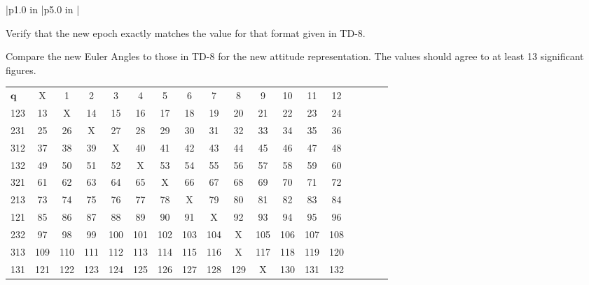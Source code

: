 \begin{table}[htbp!]
\begin{tabular}{|p{1.0 in} |p{5.0 in} |}
\begin{compactenum}
             \item Verify that the new epoch exactly matches the value for that format given in TD-8.
             \item Compare the new Euler Angles to those in TD-8 for the new attitude representation.  The values should agree to at least 13 significant figures.
          \end{compactenum}
          \vspace{.1 in}
          \begin{centering} \footnotesize
          \begin{tabular}{|l|c|c|c|c|c|c|c|c|c|c|c|c|c|c|c|c|c|}
          \hline
             & \rotatebox{90}{$\mathbf{q}$ } &
             \rotatebox{90}{ 123 } &
             \rotatebox{90}{ 231  }&
             \rotatebox{90}{ 312  } &
             \rotatebox{90}{ 132  } &
             \rotatebox{90}{ 321 } &
             \rotatebox{90}{ 213  }  &
             \rotatebox{90}{ 121 } &
             \rotatebox{90}{ 232  } &
             \rotatebox{90}{ 313  } &
             \rotatebox{90}{ 131  } &
             \rotatebox{90}{ 323  } &
             \rotatebox{90}{ 212  }  \\ \hline
             $\mathbf{q}$ & X & 1 & 2 & 3 & 4 & 5 & 6 & 7 & 8 & 9 & 10 & 11 & 12 \\ \hline
             123 & 13 & X & 14 & 15 & 16 & 17 & 18 & 19 & 20 & 21 & 22 & 23 & 24 \\ \hline
             231 & 25 & 26 & X & 27 & 28 & 29 & 30 & 31 & 32 & 33 & 34 &35 & 36 \\ \hline
             312 & 37 & 38 & 39 & X & 40 & 41 & 42 & 43 & 44 & 45 & 46 & 47 & 48 \\ \hline
             132 & 49 & 50 & 51 & 52 & X & 53 & 54 & 55 & 56 & 57 & 58 & 59 & 60 \\ \hline
             321 & 61 & 62 & 63 & 64 & 65 & X & 66 & 67 & 68 & 69 & 70 & 71 & 72 \\ \hline
             213 & 73 & 74 & 75 & 76 & 77 & 78 & X & 79 & 80 & 81 & 82 & 83 & 84  \\ \hline
             121 & 85 & 86 & 87 & 88 & 89 & 90 & 91 & X & 92 & 93 & 94 & 95 & 96  \\ \hline
             232 & 97 & 98 & 99 & 100 & 101 & 102 & 103 & 104 & X & 105 & 106 & 107 & 108  \\ \hline
             313 & 109 & 110 & 111 & 112 & 113 & 114 & 115 & 116  & X  & 117 & 118 & 119 & 120  \\ \hline
             131 & 121 & 122 & 123 & 124 & 125 & 126 & 127 & 128 & 129 & X & 130 & 131 & 132  \\ \hline

\end{tabular}
\end{centering}
\end{tabular}
\end{table}
